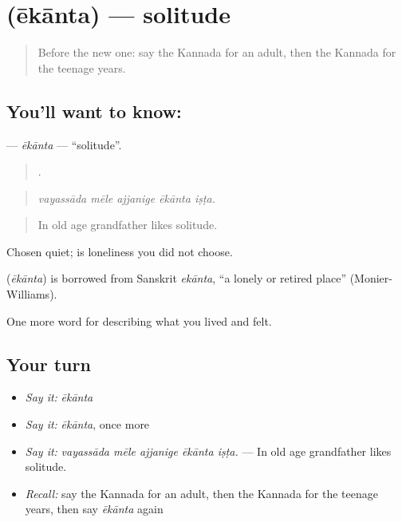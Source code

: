 \section[\texorpdfstring{\kn{ಏಕಾಂತ} (ēkānta)}{ಏಕಾಂತ (ēkānta)}]{ (ēkānta) — solitude}

\label{lesson:KA-C529-ekanta}



\begin{quote}
Before the new one: say the Kannada for an adult, then the Kannada for the teenage years.
\end{quote}

\subsection*{You'll want to know: }
\textbf{} — \emph{ēkānta} — \textquotedblleft{}solitude\textquotedblright{}.

\begin{quote}
    .
\end{quote}

\begin{quote}
\emph{vayassāda mēle ajjanige ēkānta iṣṭa.}
\end{quote}

\begin{quote}
In old age grandfather likes solitude.
\end{quote}

Chosen quiet;  is loneliness you did not choose.

\begin{cousinweb}
\textbf{} (\emph{ēkānta}) is borrowed from Sanskrit \emph{ekānta}, \textquotedblleft{}a lonely or retired place\textquotedblright{} (Monier-Williams).
\end{cousinweb}

\begin{grammarlens}[title={What you've built}]
One more word for describing what you lived and felt.
\end{grammarlens}

\subsection*{Your turn}
\begin{itemize}
\raggedright
  \item \emph{Say it:} \emph{ēkānta}
  \item \emph{Say it:} \emph{ēkānta}, once more
  \item \emph{Say it:} \emph{vayassāda mēle ajjanige ēkānta iṣṭa.} — In old age grandfather likes solitude.
  \item \emph{Recall:} say the Kannada for an adult, then the Kannada for the teenage years, then say \emph{ēkānta} again
\end{itemize}

